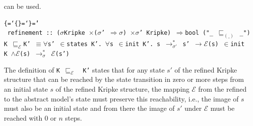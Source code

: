\documentclass{llncs}
\newenvironment{ttbox}{\begin{alltt}\ttbraces\small\tt}%
                      {\end{alltt}}
\def\ttbraces{\let\.=\nobreak\chardef\{=`\{\chardef\}=`\}\chardef\|=`\\}
\newcommand\ttand{\mbox{{$\land$}}}
\newcommand\ttfun{\mbox{{$\Rightarrow$}}}
\newcommand\ttimp{\mbox{{$\longrightarrow$}}}
\newcommand\ttequiv{\mbox{{$\equiv$}}}
\newcommand\ttforall{\mbox{{$\forall$}}}
\newcommand\ttin{\mbox{{$\in$}}}
\newcommand\tttimes{\mbox{\( \times \)}}
\newcommand\ttrelstar[1]{\mbox{{$\to_{#1}^*$}}}
\newcommand\ttsigma{\mbox{{$\sigma$}}}
\newcommand\ttmref[1]{\mbox{{$\sqsubseteq_{#1}$}}}
\newcommand\ttmeref{\ttmref{\mathcal{E}}}
\newcommand\ttecal{\mbox{$\mathcal{E}$}}
\begin{document}
can be used.
\begin{ttbox}
 refinement :: (\ttsigma Kripke \tttimes (\ttsigma' \ttfun \ttsigma) \tttimes \ttsigma' Kripke) \ttfun bool ("_ \ttmref{(\_)} _")
  K \ttmeref K' \ttequiv \ttforall s' \ttin states K'. \ttforall s \ttin init K'. 
             s \ttrelstar{\sigma'} s' \ttimp \ttecal(s) \ttin init K \ttand \ttecal(s) \ttrelstar{\sigma} \ttecal(s')
\end{ttbox}
The definition of \texttt{K \ttmeref\, K'} states that for any state $s'$ 
of the refined Kripke structure that can be reached by the state transition
in zero or more steps from an initial state $s$ of the refined Kripke 
structure, the mapping ${\mathcal E}$ from the refined to the abstract 
model's state must preserve this reachability, i.e., the image of
$s$ must also be an initial state and from there the image of $s'$
under ${\mathcal E}$ must be reached with $0$ or $n$ steps.
\end{document}
